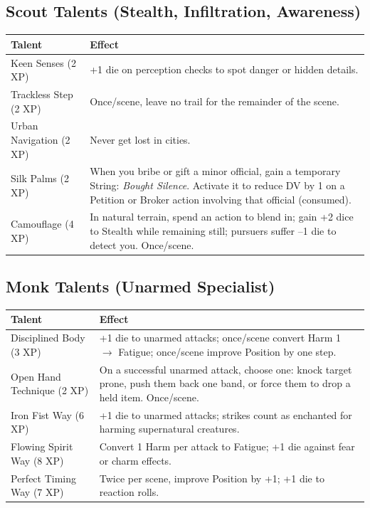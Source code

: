 \subsection{Scout Talents (Stealth, Infiltration, Awareness)}

\begin{tabular}{@{}lp{10cm}@{}}
\toprule
\textbf{Talent} & \textbf{Effect} \\
\midrule
Keen Senses (2 XP) & +1 die on perception checks to spot danger or hidden details. \\
Trackless Step (2 XP) & Once/scene, leave no trail for the remainder of the scene. \\
Urban Navigation (2 XP) & Never get lost in cities. \\
Silk Palms (2 XP) & When you bribe or gift a minor official, gain a temporary String: \textit{Bought Silence}. Activate it to reduce DV by 1 on a Petition or Broker action involving that official (consumed). \\
Camouflage (4 XP) & In natural terrain, spend an action to blend in; gain +2 dice to Stealth while remaining still; pursuers suffer --1 die to detect you. Once/scene. \\
\bottomrule
\end{tabular}

\subsection{Monk Talents (Unarmed Specialist)}

\begin{tabular}{@{}lp{10cm}@{}}
\toprule
\textbf{Talent} & \textbf{Effect} \\
\midrule
Disciplined Body (3 XP) & +1 die to unarmed attacks; once/scene convert Harm 1 $\rightarrow$ Fatigue; once/scene improve Position by one step. \\
Open Hand Technique (2 XP) & On a successful unarmed attack, choose one: knock target prone, push them back one band, or force them to drop a held item. Once/scene. \\
Iron Fist Way (6 XP) & +1 die to unarmed attacks; strikes count as enchanted for harming supernatural creatures. \\
Flowing Spirit Way (8 XP) & Convert 1 Harm per attack to Fatigue; +1 die against fear or charm effects. \\
Perfect Timing Way (7 XP) & Twice per scene, improve Position by +1; +1 die to reaction rolls. \\
\bottomrule
\end{tabular}


